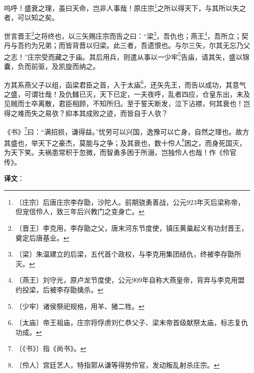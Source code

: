 \documentclass[12pt,UTF-8,openany,a4]{ctexbook}
\begin{document}
\begin{large}
    
    呜呼！盛衰之理，虽曰天命，岂非人事哉！原庄宗\footnote{〔庄宗〕\yiwen 后唐庄宗李存勖，沙陀人。前期骁勇善战，公元923年灭后梁称帝，但宠信伶人，致三年后兴教门之变身亡。}之所以得天下，与其所以失之者，可以知之矣。
    
    世言晋王\footnote{〔晋王〕\yiwen 李克用，李存勖之父，唐末河东节度使，镇压黄巢起义有功封晋王，奠定后唐基业。}之将终也，以三矢赐庄宗而告之曰：“梁\footnote{〔梁〕\yiwen 朱温建立的后梁，五代首个政权，与李克用集团结仇，终被李存勖所灭。}，吾仇也；燕王\footnote{〔燕王〕\yiwen 刘守光，原卢龙节度使，公元909年自称大燕皇帝，背弃与李克用盟约投梁，后被李存勖擒杀。}，吾所立；契丹与吾约为兄弟；而皆背晋以归梁。此三者，吾遗恨也。与尔三矢，尔其无忘乃父之志！”庄宗受而藏之于庙。其后用兵，则遣从事以一少牢\footnote{〔少牢〕\yiwen 诸侯祭祀规格，用羊、猪二牲。}告庙，请其矢，盛以锦囊，负而前驱，及凯旋而纳之。
    
    方其系燕父子以组，函梁君臣之首，入于太庙\footnote{〔太庙〕\yiwen 帝王祖庙，庄宗将俘虏刘仁恭父子、梁末帝首级献祭太庙，标志复仇功成。}，还矢先王，而告以成功，其意气之盛，可谓壮哉！及仇雠已灭，天下已定，一夫夜呼，乱者四应，仓皇东出，未及见贼而士卒离散，君臣相顾，不知所归。至于誓天断发，泣下沾襟，何其衰也！岂得之难而失之易欤？抑本其成败之迹，而皆自于人欤？
    
    《书》\footnote{〔《书》〕\yiwen 指《尚书》。}曰：“满招损，谦得益。”忧劳可以兴国，逸豫可以亡身，自然之理也。故方其盛也，举天下之豪杰，莫能与之争；及其衰也，数十伶人\footnote{〔伶人〕\yiwen 宫廷艺人，特指郭从谦等得势伶官，发动叛乱射杀庄宗。}困之，而身死国灭，为天下笑。夫祸患常积于忽微，而智勇多困于所溺，岂独伶人也哉！作《伶官传》。

\end{large}


\newpage

\begin{Large}
   \noindent \textbf{译文}：
\end{Large}

\vspace{1em}
\end{document}
